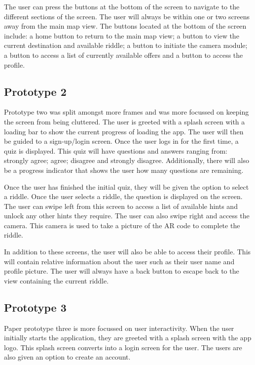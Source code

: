 \documentclass[10pt,twocolumn]{article} %
\begin{document}
The user can press the buttons at the bottom of the screen to navigate to the different sections of the screen. The user will always be within one or two screens away from the main map view. The buttons located at the bottom of the screen include: a home button to return to the main map view; a button to view the current destination and available riddle; a button to initiate the camera module; a button to access a list of currently available offers and a button to access the profile.

\subsection*{Prototype 2}
Prototype two was split amongst more frames and was more focussed on keeping the screen from being cluttered. The user is greeted with a splash screen with a loading bar to show the current progress of loading the app. The user will then be guided to a sign-up/login screen. Once the user logs in for the first time, a quiz is displayed. This quiz will have questions and answers ranging from: strongly agree; agree; disagree and strongly disagree. Additionally, there will also be a progress indicator that shows the user how many questions are remaining. 

Once the user has finished the initial quiz, they will be given the option to select a riddle. Once the user selects a riddle, the question is displayed on the screen. The user can swipe left from this screen to access a list of available hints and unlock any other hints they require. The user can also swipe right and access the camera. This camera is used to take a picture of the AR code to complete the riddle. 

In addition to these screens, the user will also be able to access their profile. This will contain relative information about the user such as their user name and profile picture. The user will always have a back button to escape back to the view containing the current riddle.

\subsection*{Prototype 3}
Paper prototype three is more focussed on user interactivity. When the user initially starts the application, they are greeted with a splash screen with the app logo. This splash screen converts into a login screen for the user. The users are also given an option to create an account.
\end{document}
